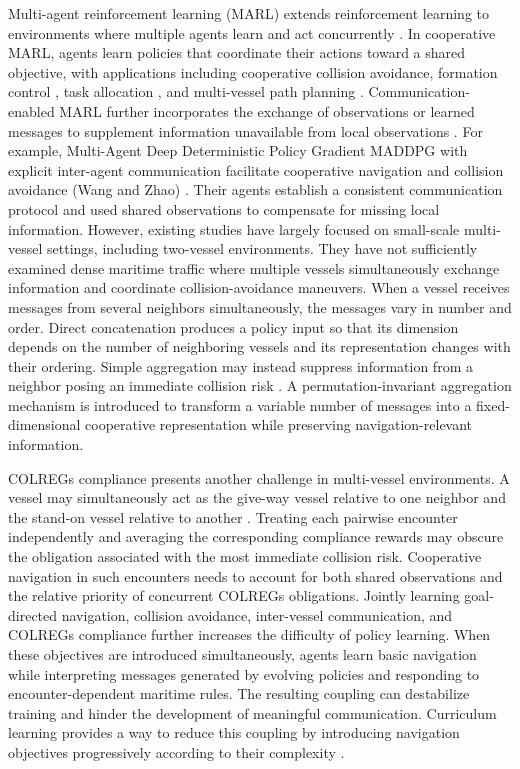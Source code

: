 \documentclass[final,5p,times,twocolumn]{elsarticle}
\begin{document}
{Multi-agent reinforcement learning (MARL) extends reinforcement learning to environments where multiple agents learn and act concurrently \cite{31}. In cooperative MARL, agents learn policies that coordinate their actions toward a shared objective, with applications including cooperative collision avoidance, formation control  \cite{32}, task allocation \cite{33}, and multi-vessel path planning \cite{34}. Communication-enabled MARL further incorporates the exchange of observations or learned messages to supplement information unavailable from local observations \cite{35}. For example, Multi-Agent Deep Deterministic Policy Gradient MADDPG  with explicit inter-agent communication facilitate cooperative navigation and collision avoidance (Wang and Zhao) \cite{36}. 
Their agents establish a consistent communication protocol and used shared observations to compensate for missing local information. However, existing studies have largely focused on small-scale multi-vessel settings, including two-vessel environments. They have not sufficiently examined dense maritime traffic where multiple vessels simultaneously exchange information and coordinate collision-avoidance maneuvers.
When a vessel receives messages from several neighbors simultaneously, the messages vary in number and order. Direct concatenation produces a policy input so that its dimension depends on the number of neighboring vessels and its representation changes with their ordering. Simple aggregation may instead suppress information from a neighbor posing an immediate collision risk \cite{37}. A permutation-invariant aggregation mechanism is introduced to transform a variable number of messages into a fixed-dimensional cooperative representation while preserving navigation-relevant information.

COLREGs compliance presents another challenge in multi-vessel environments. A vessel may simultaneously act as the give-way vessel relative to one neighbor and the stand-on vessel relative to another \cite{38,39}. Treating each pairwise encounter independently and averaging the corresponding compliance rewards may obscure the obligation associated with the most immediate collision risk. Cooperative navigation in such encounters needs to account for both shared observations and the relative priority of concurrent COLREGs obligations.
Jointly learning goal-directed navigation, collision avoidance, inter-vessel communication, and COLREGs compliance further increases the difficulty of policy learning. When these objectives are introduced simultaneously, agents learn basic navigation while interpreting messages generated by evolving policies and responding to encounter-dependent maritime rules. The resulting coupling can destabilize training and hinder the development of meaningful communication. Curriculum learning provides a way to reduce this coupling by introducing navigation objectives progressively according to their complexity \cite{43,44}.

}
\end{document}
